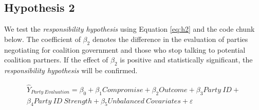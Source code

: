 \documentclass[]{article}
\begin{document}
\hypertarget{hypothesis-2}{%
\subsection{Hypothesis 2}\label{hypothesis-2}}

We test the \emph{responsibility hypothesis} using Equation \ref{eq:h2}
and the code chunk below. The coefficient of \(\beta_{2}\) denotes the
difference in the evaluation of parties negotiating for coalition
government and those who stop talking to potential coalition partners.
If the effect of \(\beta_{2}\) is positive and statistically
significant, the \emph{responsibility hypothesis} will be confirmed.

\begin{equation}\label{eq:h2}
  \begin{aligned}
    \hat{Y}_{Party \ Evaluation} = \beta_{0} + \beta_{1}Compromise  +
    \beta_{2}Outcome + \beta_{3}Party \ ID + \nonumber \\
    \beta_{4}Party \ ID \ Strength +
    \beta_{5}Unbalanced \ Covariates + \varepsilon
  \end{aligned}
\end{equation}
\end{document}
